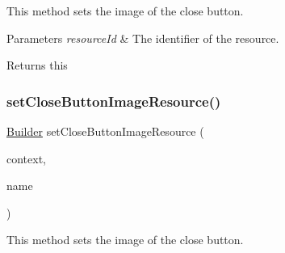 This method sets the image of the close button. 


\begin{DoxyParams}{Parameters}
{\em resource\+Id} & The identifier of the resource. \\
\hline
\end{DoxyParams}
\begin{DoxyReturn}{Returns}
this 
\end{DoxyReturn}
\mbox{\label{classcom_1_1toast_1_1android_1_1gamebase_1_1_gamebase_web_view_configuration_1_1_builder_a2d3eec6995ebe8ae5bbb8b4883f0b721}} 
\subsubsection{\texorpdfstring{set\+Close\+Button\+Image\+Resource()}{setCloseButtonImageResource()}\hspace{0.1cm}{\footnotesize\ttfamily [2/2]}}
{\footnotesize\ttfamily \hyperlink{classcom_1_1toast_1_1android_1_1gamebase_1_1_gamebase_web_view_configuration_1_1_builder}{Builder} set\+Close\+Button\+Image\+Resource (\begin{DoxyParamCaption}\item[{@Non\+Null final Context}]{context,  }\item[{@Non\+Null final String}]{name }\end{DoxyParamCaption})}



This method sets the image of the close button. 


